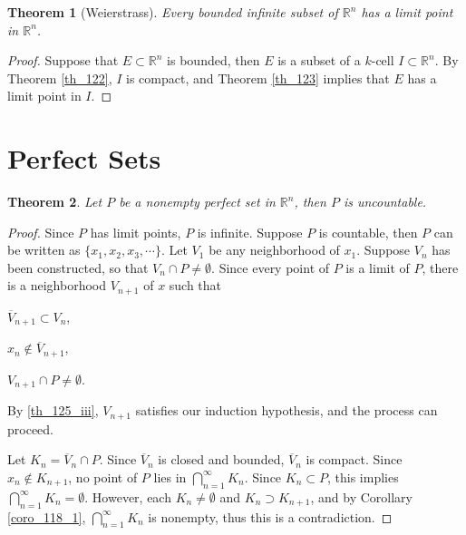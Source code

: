 \documentclass[11pt]{book}
\newtheorem{theorem}{Theorem}[chapter]
\theoremstyle{definition}
\numberwithin{equation}{chapter}
\begin{document}
\medskip

\begin{theorem}[Weierstrass]\label{}
Every bounded infinite subset of $\mathbb{R}^n$ has a limit point in $\mathbb{R}^n$.
\end{theorem}
\begin{proof}
Suppose that $E \subset \mathbb{R}^n$ is bounded, then $E$ is a subset of a $k$-cell $I \subset \mathbb{R}^n$. By Theorem \ref{th_122}, $I$ is compact, and Theorem \ref{th_123} implies that $E$ has a limit point in $I$.
\end{proof}

\medskip



\section{Perfect Sets}

\begin{theorem}\label{th_125}
Let $P$ be a nonempty perfect set in $\mathbb{R}^n$, then $P$ is uncountable.
\end{theorem}
\begin{proof}
Since $P$ has limit points, $P$ is infinite. Suppose $P$ is countable, then $P$ can be written as $\{x_1, x_2, x_3, \cdots\}$. Let $V_1$ be any neighborhood of $x_1$. Suppose $V_n$ has been constructed, so that $V_n \cap P \neq \emptyset$. Since every point of $P$ is a limit of $P$, there is a neighborhood $V_{n+1}$ of $x$ such that \begin{enumerate*}[label=(\roman*)]
    \item $\overline{V}_{n+1} \subset V_n$,
    \item $x_n \notin \overline{V}_{n+1}$,
    \item $V_{n+1} \cap P \neq \emptyset$.\label{th_125_iii}
\end{enumerate*}
By \ref{th_125_iii}, $V_{n+1}$ satisfies our induction hypothesis, and the process can proceed. 

Let $K_n = \overline{V}_{n} \cap P$. Since $\overline{V}_{n}$ is closed and bounded, $\overline{V}_{n}$ is compact. Since $x_n \notin K_{n+1}$, no point of $P$ lies in $\bigcap^\infty_{n=1} K_n$. Since $K_n \subset P$, this implies $\bigcap^\infty_{n=1} K_n = \emptyset$. However, each $K_n \neq \emptyset$ and $K_n \supset K_{n+1}$, and by Corollary \ref{coro_118_1}, $\bigcap^\infty_{n=1} K_n$ is nonempty, thus this is a contradiction.
\end{proof}
\end{document}
